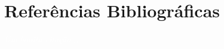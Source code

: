 \documentclass[11pt,fleqn]{book} %
\begin{document}
\chapter*{Referências Bibliográficas}\label{referencias}
\vspace{6em}
\begin{flushright}
	\textit{\textcolor{white}{Um bonita citação...}}
\end{flushright}
\vspace{12em}
\printbibliography[heading=bibempty]



%
\end{document}
